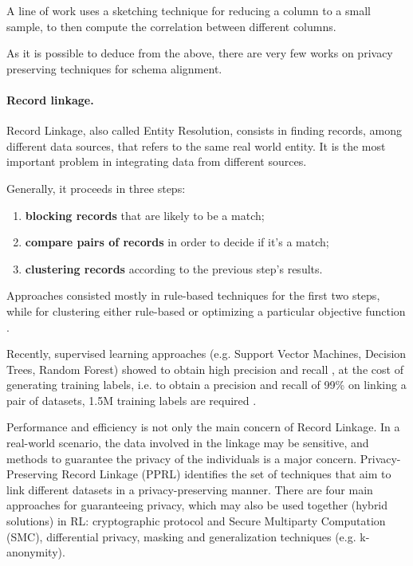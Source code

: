 \documentclass[12pt]{article}
\begin{document}
A line of work \cite*{santos_sketch-based_2022, santos_correlation_2021} uses a sketching technique for reducing a column to a small sample, to then compute the correlation between different columns.

As it is possible to deduce from the above, there are very few works on privacy preserving techniques for schema alignment.




\paragraph{Record linkage.}
Record Linkage, also called Entity Resolution, consists in finding records, among different data sources, that refers to the same real world entity. 
It is the most important problem in integrating data from different sources. 

Generally, it proceeds in three steps: 
\begin{enumerate}
   \item \textbf{blocking records} that are likely to be a match;
   \item \textbf{compare pairs of records} in order to decide if it's a match;
   \item \textbf{clustering records} according to the previous step's results.
\end{enumerate}

Approaches consisted mostly in rule-based techniques \cite*{recordLinkTheory, Gal2011} for the first two steps, while for clustering either 
rule-based or optimizing a particular objective function \cite*{Hass2009}. 

Recently, supervised learning approaches (e.g. Support Vector Machines, Decision Trees, Random Forest) showed to obtain high precision and recall \cite*{Das2017}, 
at the cost of generating training labels, i.e. to obtain a precision and recall of 99\% on linking a pair of datasets, 1.5M training labels are required \cite*{dong_data_2018}.

Performance and efficiency is not only the main concern of Record Linkage. In a real-world scenario, the data involved in the linkage may be sensitive, and methods to guarantee 
the privacy of the individuals is a major concern. Privacy-Preserving Record Linkage (PPRL) identifies the set of techniques that aim to link different datasets in 
a privacy-preserving manner.
There are four main approaches for guaranteeing privacy, which may also be used together (hybrid solutions) in RL: cryptographic protocol and Secure Multiparty Computation (SMC), differential privacy, masking and generalization techniques (e.g. k-anonymity). 
\end{document}
